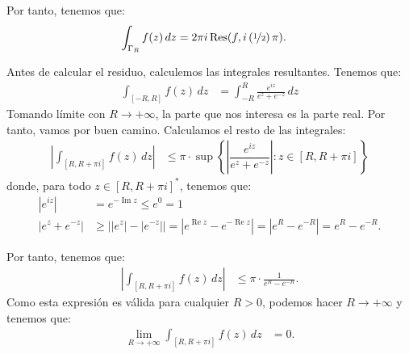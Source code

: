 \documentclass[12pt]{article}
\renewcommand{\Re}{\operatorname{Re}} %
\renewcommand{\Im}{\operatorname{Im}}
\DeclareMathOperator{\Res}{Res}
\begin{document}
\begin{ejercicio}[2.5 puntos]
    Por tanto, tenemos que:
    \begin{align*}
        \int_{\Gamma_R} f(z) \, dz &= 2\pi i\Res(f, i\left(\nicefrac{1}{2}\right)\pi).
    \end{align*}

    Antes de calcular el residuo, calculemos las integrales resultantes. Tenemos que:
    \begin{align*}
        \int_{[-R, R]} f(z) \, dz &= \int_{-R}^{R} \frac{e^{iz}}{e^z + e^{-z}} \, dz
    \end{align*}
    Tomando límite con $R\to +\infty$, la parte que nos interesa es la parte real. Por tanto, vamos por buen camino. Calculamos el resto de las integrales:
    \begin{align*}
        \left|\int_{[R, R + \pi i]} f(z) \, dz\right| &\leq \pi\cdot \sup\left\{\left|\dfrac{e^{iz}}{e^z + e^{-z}}\right| : z\in [R, R + \pi i]\right\}
    \end{align*}
    donde, para todo $z\in [R, R + \pi i]^*$, tenemos que:
    \begin{align*}
        |e^{iz}| &= e^{-\Im z}\leq e^0=1\\
        |e^z + e^{-z}| &\geq \left||e^z| - |e^{-z}|\right| = \left|e^{\Re z} - e^{-\Re z}\right| = \left|e^{R} - e^{-R}\right| = e^{R} - e^{-R}.
    \end{align*}

    Por tanto, tenemos que:
    \begin{align*}
        \left|\int_{[R, R + \pi i]} f(z) \, dz\right| &\leq \pi\cdot \frac{1}{e^{R} - e^{-R}}.
    \end{align*}
    Como esta expresión es válida para cualquier $R > 0$, podemos hacer $R \to +\infty$ y tenemos que:
    \begin{align*}
        \lim_{R\to+\infty} \int_{[R, R + \pi i]} f(z) \, dz &= 0.
    \end{align*}


\end{ejercicio}
\end{document}
